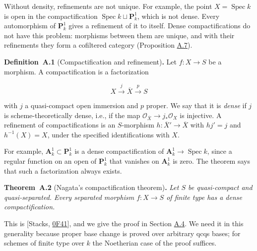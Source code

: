 \documentclass[11pt]{article}
\newenvironment{bpstatement}[2]{\par\addvspace{0.6\baselineskip}\noindent\textbf{#1}#2\textbf{.}\enspace\ignorespaces}
  {\par\addvspace{0.4\baselineskip}}
\newenvironment{bpstatementit}[2]{\begin{bpstatement}{#1}{#2}\itshape\ignorespaces}{\end{bpstatement}}
\begin{document}
Without density, refinements are not unique. For example, the point \(X=\operatorname{Spec}k\) is open in the compactification \(\operatorname{Spec}k\sqcup\mathbf P^1_k\), which is not dense. Every automorphism of \(\mathbf P^1_k\) gives a refinement of it to itself. Dense compactifications do not have this problem: morphisms between them are unique, and with their refinements they form a cofiltered category (Proposition \hyperref[bp19]{A.7}).

\label{bp5}%
\begin{bpstatement}{Definition~A.1}{ (Compactification and refinement)}
Let \(f:X\to S\) be a morphism. A compactification is a factorization

\[
X\xrightarrow{j}\overline X\xrightarrow{p}S
\]

with \(j\) a quasi-compact open immersion and \(p\) proper. We say that it is \emph{dense} if \(j\) is scheme-theoretically dense, i.e., if the map \(\mathcal O_{\overline X}\to j_*\mathcal O_X\) is injective. A refinement of compactifications is an \(S\)-morphism \(h:\overline X'\to\overline X\) with \(hj'=j\) and \(h^{-1}(X)=X\), under the specified identifications with \(X\).
\end{bpstatement}

\label{bp6}%
For example, \(\mathbf A^1_k\subset\mathbf P^1_k\) is a dense compactification of \(\mathbf A^1_k\to\operatorname{Spec}k\), since a regular function on an open of \(\mathbf P^1_k\) that vanishes on \(\mathbf A^1_k\) is zero. The theorem says that such a factorization always exists.

\label{bp7}%
\begin{bpstatementit}{Theorem~A.2}{ (Nagata's compactification theorem)}
Let \(S\) be quasi-compact and quasi-separated. Every separated morphism \(f:X\to S\) of finite type has a dense compactification.
\end{bpstatementit}

\label{bp8}%
This is [Stacks, \href{https://stacks.math.columbia.edu/tag/0F41}{0F41}], and we give the proof in Section \hyperref[bp63]{A.4}. We need it in this generality because proper base change is proved over arbitrary qcqs bases; for schemes of finite type over \(k\) the Noetherian case of the proof suffices.
\end{document}
